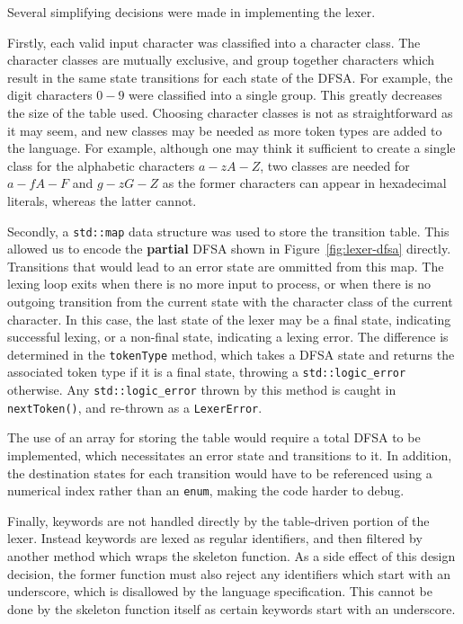 \documentclass[11pt,a4paper]{scrartcl}
\begin{document}
Several simplifying decisions were made in implementing the lexer.

Firstly, each valid input character was classified into a character class. The character classes are mutually exclusive, and group together characters which result in the same state transitions for each state of the DFSA. For example, the digit characters $0-9$ were classified into a single group. This greatly decreases the size of the table used. Choosing character classes is not as straightforward as it may seem, and new classes may be needed as more token types are added to the language. For example, although one may think it sufficient to create a single class for the alphabetic characters $a-zA-Z$, two classes are needed for $a-fA-F$ and $g-zG-Z$ as the former characters can appear in hexadecimal literals, whereas the latter cannot.

Secondly, a \verb!std::map! data structure was used to store the transition table. This allowed us to encode the \textbf{partial} DFSA shown in Figure~\ref{fig:lexer-dfsa} directly. Transitions that would lead to an error state are ommitted from this map. The lexing loop exits when there is no more input to process, or when there is no outgoing transition from the current state with the character class of the current character. In this case, the last state of the lexer may be a final state, indicating successful lexing, or a non-final state, indicating a lexing error. The difference is determined in the \verb|tokenType| method, which takes a DFSA state and returns the associated token type if it is a final state, throwing a \verb|std::logic_error| otherwise. Any \verb|std::logic_error| thrown by this method is caught in \verb|nextToken()|, and re-thrown as a \verb|LexerError|.

The use of an array for storing the table would require a total DFSA to be implemented, which necessitates an error state and transitions to it. In addition, the destination states for each transition would have to be referenced using a numerical index rather than an \verb|enum|, making the code harder to debug.

Finally, keywords are not handled directly by the table-driven portion of the lexer. Instead keywords are lexed as regular identifiers, and then filtered by another method which wraps the skeleton function. As a side effect of this design decision, the former function must also reject any identifiers which start with an underscore, which is disallowed by the language specification. This cannot be done by the skeleton function itself as certain keywords start with an underscore.
\end{document}
